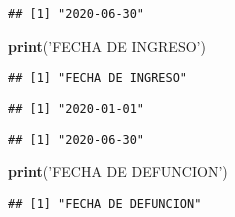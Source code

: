 \documentclass[]{article}
\newenvironment{Shaded}{\begin{snugshade}}{\end{snugshade}}
\newcommand{\KeywordTok}[1]{\textcolor[rgb]{0.13,0.29,0.53}{\textbf{#1}}}
\newcommand{\NormalTok}[1]{#1}
\newcommand{\OperatorTok}[1]{\textcolor[rgb]{0.81,0.36,0.00}{\textbf{#1}}}
\newcommand{\StringTok}[1]{\textcolor[rgb]{0.31,0.60,0.02}{#1}}
\begin{document}
\begin{verbatim}
## [1] "2020-06-30"
\end{verbatim}

\begin{Shaded}
\begin{Highlighting}[]
\KeywordTok{print}\NormalTok{(}\StringTok{'FECHA DE INGRESO'}\NormalTok{)}
\end{Highlighting}
\end{Shaded}

\begin{verbatim}
## [1] "FECHA DE INGRESO"
\end{verbatim}

\begin{Shaded}
\end{Shaded}

\begin{verbatim}
## [1] "2020-01-01"
\end{verbatim}

\begin{Shaded}
\end{Shaded}

\begin{verbatim}
## [1] "2020-06-30"
\end{verbatim}

\begin{Shaded}
\begin{Highlighting}[]
\KeywordTok{print}\NormalTok{(}\StringTok{'FECHA DE DEFUNCION'}\NormalTok{)}
\end{Highlighting}
\end{Shaded}

\begin{verbatim}
## [1] "FECHA DE DEFUNCION"
\end{verbatim}

\begin{Shaded}
\end{Shaded}
\end{document}
